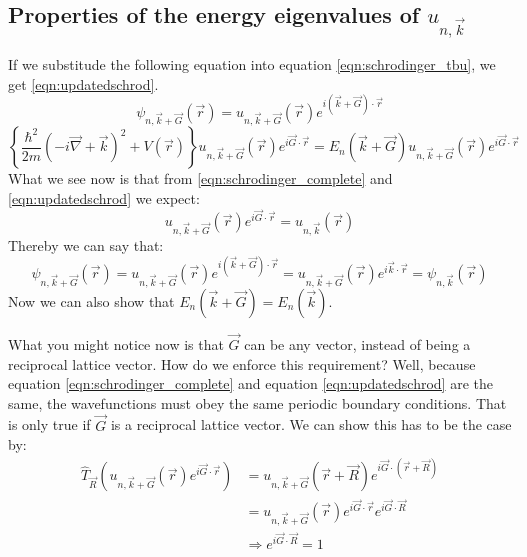 \begin{RECAP}
\section{Properties of the energy eigenvalues of $u_{n, \vec{k}}$}
\begin{myproof}
	If we substitude the following equation into equation \ref{eqn:schrodinger_tbu}, we get \ref{eqn:updatedschrod}.
	\begin{equation}
		\psi_{n, \vec{k} + \vec{G}}(\vec{r}) = u_{n, \vec{k} + \vec{G}}(\vec{r})e^{i(\vec{k} + \vec{G})\cdot\vec{r}}
	\end{equation}
	\begin{equation}
		\left\{\frac{\hbar^2}{2m}\left(-i\vec{\nabla} + \vec{k}\right)^2 + V(\vec{r})\right\}u_{n, \vec{k} + \vec{G}}(\vec{r})e^{i\vec{G}\cdot\vec{r}} = E_n(\vec{k} + \vec{G})u_{n, \vec{k} + \vec{G}}(\vec{r})e^{i\vec{G}\cdot\vec{r}} \label{eqn:updatedschrod}
	\end{equation}
	What we see now is that from \ref{eqn:schrodinger_complete} and \ref{eqn:updatedschrod} we expect:
	\begin{equation}
		u_{n, \vec{k} + \vec{G}}(\vec{r})e^{i\vec{G}\cdot\vec{r}} = u_{n, \vec{k}}(\vec{r})
	\end{equation}
	Thereby we can say that:
	\begin{equation}
		\psi_{n, \vec{k} + \vec{G}}(\vec{r}) = u_{n, \vec{k} + \vec{G}}(\vec{r})e^{i(\vec{k} + \vec{G})\cdot\vec{r}} = u_{n, \vec{k} + \vec{G}}(\vec{r})e^{i\vec{k}\cdot\vec{r}} = \psi_{n, \vec{k}}(\vec{r})
	\end{equation}
	Now we can also show that $E_n(\vec{k} + \vec{G}) = E_n(\vec{k})$.
\end{myproof}
What you might notice now is that $\vec{G}$ can be any vector, instead of being a reciprocal lattice vector. How do we enforce this requirement? Well, because equation \ref{eqn:schrodinger_complete} and equation \ref{eqn:updatedschrod} are the same, the wavefunctions must obey the same periodic boundary conditions. That is only true if $\vec{G}$ is a reciprocal lattice vector.
We can show this has to be the case by:
\begin{align}
	\hat{T}_{\vec{R}}\left(u_{n, \vec{k} + \vec{G}}(\vec{r})e^{i\vec{G}\cdot\vec{r}}\right) &= u_{n, \vec{k} + \vec{G}}(\vec{r} + \vec{R})e^{i\vec{G}\cdot(\vec{r} + \vec{R})} \\
	&= u_{n, \vec{k} + \vec{G}}(\vec{r})e^{i\vec{G}\cdot\vec{r}}e^{i\vec{G}\cdot\vec{R}} \\
	&\Rightarrow e^{i\vec{G}\cdot\vec{R}} = 1
\end{align}


\end{RECAP}
